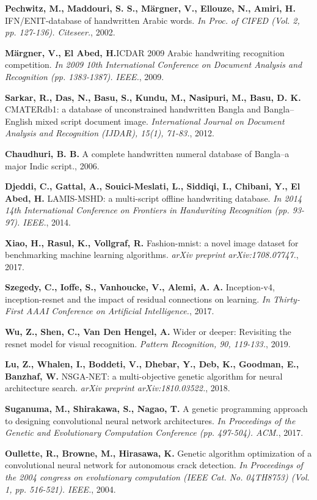 \documentclass[eng]{simposium}
\begin{document}
\begin{thebibliography}{99}
\textbf{Pechwitz, M., Maddouri, S. S., Märgner, V., Ellouze, N., Amiri, H.} IFN/ENIT-database of handwritten Arabic words. \emph{In Proc. of CIFED (Vol. 2, pp. 127-136). Citeseer.}, 2002.

\textbf{Märgner, V., El Abed, H.}ICDAR 2009 Arabic handwriting recognition competition. \emph{In 2009 10th International Conference on Document Analysis and Recognition (pp. 1383-1387). IEEE.}, 2009.

\textbf{Sarkar, R., Das, N., Basu, S., Kundu, M., Nasipuri, M., Basu, D. K.} CMATERdb1: a database of unconstrained handwritten Bangla and Bangla–English mixed script document image. \emph{International Journal on Document Analysis and Recognition (IJDAR), 15(1), 71-83.}, 2012.

\textbf{Chaudhuri, B. B.} A complete handwritten numeral database of Bangla–a major Indic script., 2006.

\textbf{Djeddi, C., Gattal, A., Souici-Meslati, L., Siddiqi, I., Chibani, Y., El Abed, H.} LAMIS-MSHD: a multi-script offline handwriting database. \emph{In 2014 14th International Conference on Frontiers in Handwriting Recognition (pp. 93-97). IEEE.}, 2014.

\textbf{Xiao, H., Rasul, K., Vollgraf, R.} Fashion-mnist: a novel image dataset for benchmarking machine learning algorithms. \emph{arXiv preprint arXiv:1708.07747.}, 2017.

\textbf{Szegedy, C., Ioffe, S., Vanhoucke, V., Alemi, A. A.} Inception-v4, inception-resnet and the impact of residual connections on learning. \emph{In Thirty-First AAAI Conference on Artificial Intelligence.}, 2017.

\textbf{Wu, Z., Shen, C., Van Den Hengel, A.} Wider or deeper: Revisiting the resnet model for visual recognition. \emph{Pattern Recognition, 90, 119-133.}, 2019.

\textbf{Lu, Z., Whalen, I., Boddeti, V., Dhebar, Y., Deb, K., Goodman, E., Banzhaf, W.} NSGA-NET: a multi-objective genetic algorithm for neural architecture search. \emph{arXiv preprint arXiv:1810.03522.}, 2018.

\textbf{Suganuma, M., Shirakawa, S., Nagao, T.} A genetic programming approach to designing convolutional neural network architectures. \emph{In Proceedings of the Genetic and Evolutionary Computation Conference (pp. 497-504). ACM.}, 2017.

\textbf{Oullette, R., Browne, M., Hirasawa, K.} Genetic algorithm optimization of a convolutional neural network for autonomous crack detection. \emph{In Proceedings of the 2004 congress on evolutionary computation (IEEE Cat. No. 04TH8753) (Vol. 1, pp. 516-521). IEEE.}, 2004.


\end{thebibliography}
\end{document}
